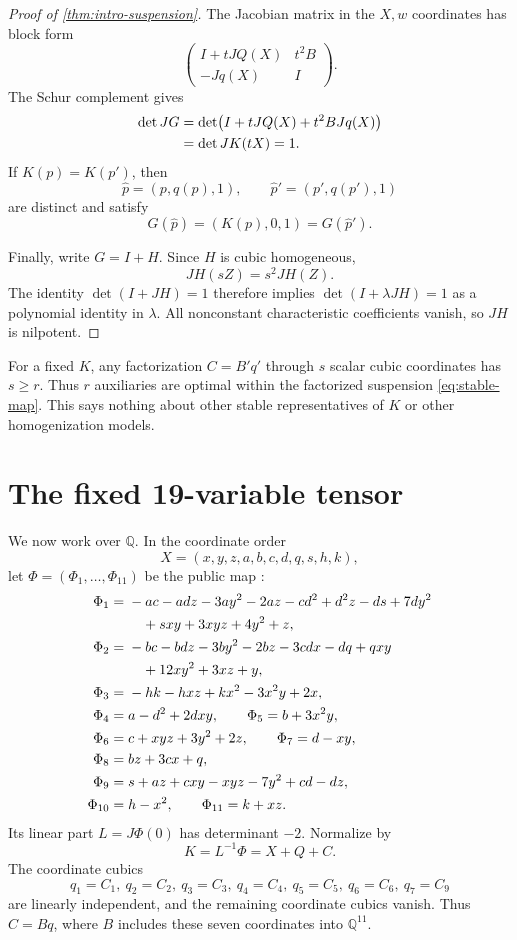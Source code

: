 \documentclass[11pt,reqno]{amsart}
\begin{document}
\begin{proof}[Proof of \cref{thm:intro-suspension}]
The Jacobian matrix in the \(X,w\) coordinates has block form
\[
\begin{pmatrix}
I+tJQ(X)&t^2B\\
-Jq(X)&I
\end{pmatrix}.
\]
The Schur complement gives
\begin{align}
\det JG
&=\det\bigl(I+tJQ(X)+t^2BJq(X)\bigr)\notag\\
&=\det JK(tX)=1.\label{eq:schur}
\end{align}
If \(K(p)=K(p')\), then
\[
\widehat p=(p,q(p),1),\qquad
\widehat p'=(p',q(p'),1)
\]
are distinct and satisfy
\[
G(\widehat p)=(K(p),0,1)=G(\widehat p').
\]

Finally, write \(G=I+H\).  Since \(H\) is cubic homogeneous,
\[
JH(sZ)=s^2JH(Z).
\]
The identity \(\det(I+JH)=1\) therefore implies
\(\det(I+\lambda JH)=1\) as a polynomial identity in \(\lambda\).
All nonconstant characteristic coefficients vanish, so \(JH\) is nilpotent.
\end{proof}

\begin{remark}
For a fixed \(K\), any factorization \(C=B'q'\) through \(s\) scalar cubic
coordinates has \(s\ge r\).  Thus \(r\) auxiliaries are optimal within the
factorized suspension \eqref{eq:stable-map}.  This says nothing about other
stable representatives of \(K\) or other homogenization models.
\end{remark}

\section{The fixed 19-variable tensor}
\label{sec:fixed-tensor}

We now work over \(\mathbb Q\).  In the coordinate order
\[
X=(x,y,z,a,b,c,d,q,s,h,k),
\]
let \(\Phi=(\Phi_1,\ldots,\Phi_{11})\) be the public map
\cite{atkinsTurkish2026}:
\begin{align*}
\Phi_1={}&-ac-adz-3ay^2-2az-cd^2+d^2z-ds+7dy^2\\
         &\quad+sxy+3xyz+4y^2+z,\notag\\
\Phi_2={}&-bc-bdz-3by^2-2bz-3cdx-dq+qxy\\
         &\quad+12xy^2+3xz+y,\notag\\
\Phi_3={}&-hk-hxz+kx^2-3x^2y+2x,\\
\Phi_4={}&a-d^2+2dxy,\qquad
\Phi_5=b+3x^2y,\\
\Phi_6={}&c+xyz+3y^2+2z,\qquad
\Phi_7=d-xy,\\
\Phi_8={}&bz+3cx+q,\\
\Phi_9={}&s+az+cxy-xyz-7y^2+cd-dz,\\
\Phi_{10}={}&h-x^2,\qquad
\Phi_{11}=k+xz.
\end{align*}
Its linear part \(L=J\Phi(0)\) has determinant \(-2\).  Normalize by
\[
K=L^{-1}\Phi=X+Q+C.
\]
The coordinate cubics
\[
q_1=C_1,\ q_2=C_2,\ q_3=C_3,\ q_4=C_4,\
q_5=C_5,\ q_6=C_6,\ q_7=C_9
\]
are linearly independent, and the remaining coordinate cubics vanish.  Thus
\(C=Bq\), where \(B\) includes these seven coordinates into
\(\mathbb Q^{11}\).
\end{document}
